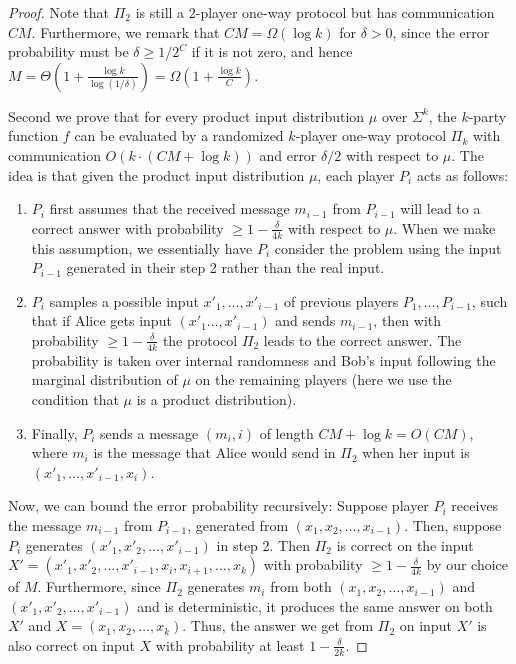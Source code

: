 \documentclass{toc}
\newcommand{\error}{\ensuremath{\delta}}
\newcommand{\bigo}[1]{\ensuremath{{{O} \left( {#1} \right)}}}
\newcommand{\bigomega}[1]{\ensuremath{{\Omega \left( {#1} \right)}}}
\newcommand{\bigtheta}[1]{\ensuremath{{\Theta\left({#1} \right)}}}
\newcommand{\alphabet}{\ensuremath{\Sigma}}
\begin{document}
\begin{proof}
Note that $\Pi_2$ is still a $2$-player one-way protocol but has communication ${CM}$. 
Furthermore, we remark that $CM=\bigomega{\log k}$ for $\error>0$, since the error probability must be $\error\ge 1/2^C$ if it is not zero, and hence $M=\bigtheta{1+\frac{\log k}{\log(1/\error)}}=\bigomega{1+\frac{\log k}{C}}$.




Second we prove that for every product input distribution $\mu$ over $\alphabet^k$, the $k$-party function $f$ can be evaluated by a randomized $k$-player one-way protocol $\Pi_k$ with communication $\bigo{k\cdot (CM+\log k)}$ and error $\error/2$ with respect to $\mu$.
The idea is that given the product input distribution $\mu$, each player $P_i$ acts as follows:
\begin{enumerate}
	\item $P_i$ first assumes that the received message $m_{i-1}$ from $P_{i-1}$ will lead to a correct answer with probability $\ge 1-\frac{\error}{4k}$ with respect to $\mu$. When we make this assumption, we essentially have $P_i$ consider the problem using the input $P_{i-1}$ generated in their step 2 rather than the real input.

	\item $P_i$ samples a possible input $x'_1,\dots,x'_{i-1}$ of previous players $P_1,\dots, P_{i-1}$, such that if Alice gets input $(x'_1\dots, x'_{i-1})$ and sends $m_{i-1}$, then with probability $\ge 1-\frac{\error}{4k}$ the protocol $\Pi_2$ leads to the correct answer. 
	The probability is taken over internal randomness and Bob's input following the marginal distribution of $\mu$ on the remaining players (here we use the condition that $\mu$ is a product distribution).

	\item Finally, $P_i$ sends a message $(m_i,i)$ of length $CM+\log k = \bigo{CM}$, where $m_i$ is the message that Alice would send in $\Pi_2$ when her input is $(x'_1,\dots,x'_{i-1},x_i)$.
\end{enumerate}

{\color{black} Now, we can bound the error probability recursively: Suppose player $P_i$ receives the message $m_{i-1}$ from $P_{i-1}$, generated from $(x_1, x_2, \dots, x_{i-1})$. Then, suppose $P_i$ generates $(x'_1, x'_2, \dots, x'_{i-1})$ in step 2. Then $\Pi_2$ is correct on the input $X' = (x'_1, x'_2, \dots, x'_{i-1}, x_i, x_{i+1}, \dots, x_k)$ with probability $\ge 1-\frac{\delta}{4k}$ by our choice of $M$. Furthermore, since $\Pi_2$ generates $m_i$ from both $(x_1, x_2, \dots, x_{i-1})$ and $(x'_1, x'_2, \dots, x'_{i-1})$ and is deterministic, it produces the same answer on both $X'$ and $X = (x_1, x_2, \dots, x_k)$. Thus, the answer we get from $\Pi_2$ on input $X'$ is also correct on input $X$ with probability at least $1-\frac{\error}{2k}$.}


\end{proof}
\end{document}
